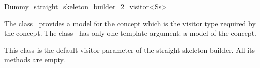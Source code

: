 

\begin{ccRefClass}{Dummy_straight_skeleton_builder_2_visitor<Ss>}


\ccDefinition

The class \ccRefName\ provides a model for the
 concept which is the visitor
type required by the 
concept. The class \ccRefName\ has only one template argument: a model of the  concept.

This class is the default visitor parameter of the straight skeleton builder. 
All its methods are empty.


\ccIsModel
{}\\

\ccSeeAlso
{}\\
\end{ccRefClass}

